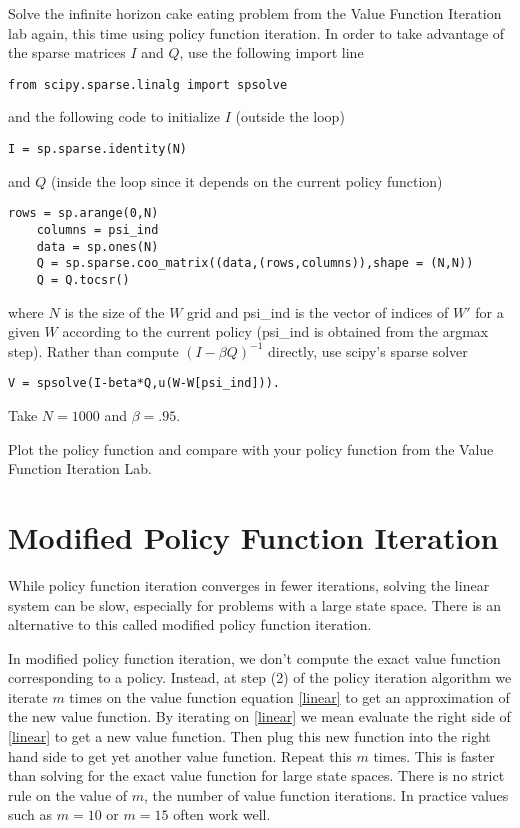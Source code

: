 \begin{problem}
Solve the infinite horizon cake eating problem from the Value Function Iteration lab again, this time using policy function iteration.  In order to take advantage of the sparse matrices $I$ and $Q$, use the following import line

\begin{lstlisting}[style=python]
  from scipy.sparse.linalg import spsolve
\end{lstlisting}

and the following code to initialize $I$ (outside the loop)
\begin{lstlisting}[style=python]
I = sp.sparse.identity(N)
\end{lstlisting}
\newpage\noindent
and $Q$ (inside the loop since it depends on the current policy function)
\begin{lstlisting}[style=python]
    rows = sp.arange(0,N)
    columns = psi_ind
    data = sp.ones(N)
    Q = sp.sparse.coo_matrix((data,(rows,columns)),shape = (N,N))
    Q = Q.tocsr()
\end{lstlisting}
where $N$ is the size of the $W$ grid and psi\_ind is the vector of indices of $W'$ for a given $W$ according to the current policy (psi\_ind is obtained from the argmax step).  Rather than compute $(I-\beta Q)^{-1}$ directly, use scipy's sparse solver

\begin{lstlisting}[style=python]
V = spsolve(I-beta*Q,u(W-W[psi_ind])).
\end{lstlisting}



Take $N = 1000$ and $\beta = .95$.

Plot the policy function and compare with your policy function from the Value Function Iteration Lab.
\end{problem}

\section*{Modified Policy Function Iteration}

While policy function iteration converges in fewer iterations, solving the linear system can be slow, especially for problems with a large state space.  There is an alternative to this called modified policy function iteration.

In modified policy function iteration, we don't compute the exact value function corresponding to a policy.  Instead, at step (2) of the policy iteration algorithm we iterate $m$ times on the value function equation \eqref{linear} to get an approximation of the new value function.  By iterating on \eqref{linear} we mean evaluate the right side of \eqref{linear} to get a new value function.  Then plug this new function into the right hand side to get yet another value function.  Repeat this $m$ times.  This is faster than solving for the exact value function for large state spaces.  There is no strict rule on the value of $m$, the number of value function iterations.  In practice values such as $m=10$ or $m=15$ often work well.

